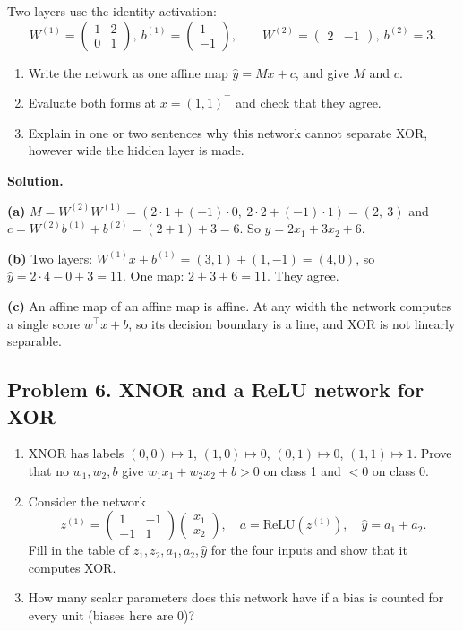 Two layers use the identity activation:
\[
W^{(1)} = \begin{pmatrix}1 & 2\\ 0 & 1\end{pmatrix},\ b^{(1)} = \begin{pmatrix}1\\-1\end{pmatrix},\qquad W^{(2)} = \begin{pmatrix}2 & -1\end{pmatrix},\ b^{(2)} = 3.
\]

\begin{enumerate}[label=(\alph*)]
\item Write the network as one affine map $\hat y = Mx + c$, and give $M$ and $c$.
\item Evaluate both forms at $x = (1,1)^\top$ and check that they agree.
\item Explain in one or two sentences why this network cannot separate XOR, however wide the hidden layer is made.
\end{enumerate}

\textbf{Solution.}

\textbf{(a)} $M = W^{(2)}W^{(1)} = (2\cdot1 + (-1)\cdot0,\ 2\cdot 2 + (-1)\cdot 1) = (2,\ 3)$ and $c = W^{(2)}b^{(1)} + b^{(2)} = (2 + 1) + 3 = 6$. So $\hat y = 2x_1 + 3x_2 + 6$.

\textbf{(b)} Two layers: $W^{(1)}x + b^{(1)} = (3,1) + (1,-1) = (4, 0)$, so $\hat y = 2\cdot 4 - 0 + 3 = 11$. One map: $2 + 3 + 6 = 11$. They agree.

\textbf{(c)} An affine map of an affine map is affine. At any width the network computes a single score $w^\top x + b$, so its decision boundary is a line, and XOR is not linearly separable.

\subsection*{Problem 6. XNOR and a ReLU network for XOR}

\begin{enumerate}[label=(\alph*)]
\item XNOR has labels $(0,0)\mapsto 1$, $(1,0)\mapsto 0$, $(0,1)\mapsto 0$, $(1,1)\mapsto 1$. Prove that no $w_1, w_2, b$ give $w_1x_1 + w_2x_2 + b > 0$ on class 1 and $< 0$ on class 0.
\item Consider the network
\[
z^{(1)} = \begin{pmatrix}1 & -1\\ -1 & 1\end{pmatrix}\begin{pmatrix}x_1\\x_2\end{pmatrix},\quad a = \mathrm{ReLU}(z^{(1)}),\quad \hat y = a_1 + a_2.
\]
Fill in the table of $z_1, z_2, a_1, a_2, \hat y$ for the four inputs and show that it computes XOR.
\item How many scalar parameters does this network have if a bias is counted for every unit (biases here are 0)?
\end{enumerate}

